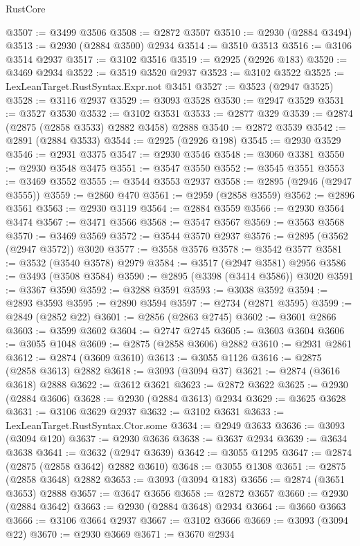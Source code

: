 \begin{lexlean}{RustCore}
\begin{coremodule}
@3507 := @3499 @3506
@3508 := @2872 @3507
@3510 := @2930 (@2884 @3494)
@3513 := @2930 (@2884 @3500) @2934
@3514 := @3510 @3513
@3516 := @3106 @3514 @2937
@3517 := @3102 @3516
@3519 := @2925 (@2926 @183)
@3520 := @3469 @2934
@3522 := @3519 @3520 @2937
@3523 := @3102 @3522
@3525 := LexLeanTarget.RustSyntax.Expr.not @3451
@3527 := @3523 (@2947 @3525)
@3528 := @3116 @2937
@3529 := @3093 @3528
@3530 := @2947 @3529
@3531 := @3527 @3530
@3532 := @3102 @3531
@3533 := @2877 @329
@3539 := @2874 (@2875 (@2858 @3533) @2882 @3458) @2888
@3540 := @2872 @3539
@3542 := @2891 (@2884 @3533)
@3544 := @2925 (@2926 @198)
@3545 := @2930 @3529
@3546 := @2931 @3375
@3547 := @2930 @3546
@3548 := @3060 @3381
@3550 := @2930 @3548 @3475
@3551 := @3547 @3550
@3552 := @3545 @3551
@3553 := @3469 @3552
@3555 := @3544 @3553 @2937
@3558 := @2895 (@2946 (@2947 @3555))
@3559 := @2860 @470
@3561 := @2959 (@2858 @3559)
@3562 := @2896 @3561
@3563 := @2930 @3119
@3564 := @2884 @3559
@3566 := @2930 @3564 @3474
@3567 := @3471 @3566
@3568 := @3547 @3567
@3569 := @3563 @3568
@3570 := @3469 @3569
@3572 := @3544 @3570 @2937
@3576 := @2895 (@3562 (@2947 @3572)) @3020
@3577 := @3558 @3576
@3578 := @3542 @3577
@3581 := @3532 (@3540 @3578) @2979
@3584 := @3517 (@2947 @3581) @2956
@3586 := @3493 (@3508 @3584)
@3590 := @2895 (@3398 (@3414 @3586)) @3020
@3591 := @3367 @3590
@3592 := @3288 @3591
@3593 := @3038 @3592
@3594 := @2893 @3593
@3595 := @2890 @3594
@3597 := @2734 (@2871 @3595)
@3599 := @2849 (@2852 @22)
@3601 := @2856 (@2863 @2745)
@3602 := @3601 @2866
@3603 := @3599 @3602
@3604 := @2747 @2745
@3605 := @3603 @3604
@3606 := @3055 @1048
@3609 := @2875 (@2858 @3606) @2882
@3610 := @2931 @2861
@3612 := @2874 (@3609 @3610)
@3613 := @3055 @1126
@3616 := @2875 (@2858 @3613) @2882
@3618 := @3093 (@3094 @37)
@3621 := @2874 (@3616 @3618) @2888
@3622 := @3612 @3621
@3623 := @2872 @3622
@3625 := @2930 (@2884 @3606)
@3628 := @2930 (@2884 @3613) @2934
@3629 := @3625 @3628
@3631 := @3106 @3629 @2937
@3632 := @3102 @3631
@3633 := LexLeanTarget.RustSyntax.Ctor.some
@3634 := @2949 @3633
@3636 := @3093 (@3094 @120)
@3637 := @2930 @3636
@3638 := @3637 @2934
@3639 := @3634 @3638
@3641 := @3632 (@2947 @3639)
@3642 := @3055 @1295
@3647 := @2874 (@2875 (@2858 @3642) @2882 @3610)
@3648 := @3055 @1308
@3651 := @2875 (@2858 @3648) @2882
@3653 := @3093 (@3094 @183)
@3656 := @2874 (@3651 @3653) @2888
@3657 := @3647 @3656
@3658 := @2872 @3657
@3660 := @2930 (@2884 @3642)
@3663 := @2930 (@2884 @3648) @2934
@3664 := @3660 @3663
@3666 := @3106 @3664 @2937
@3667 := @3102 @3666
@3669 := @3093 (@3094 @22)
@3670 := @2930 @3669
@3671 := @3670 @2934

\end{coremodule}
\end{lexlean}
